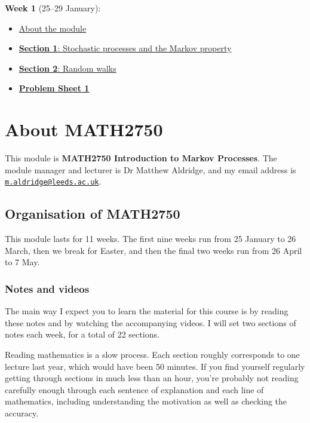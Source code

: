 \documentclass[
  a4paper,
]{article}
\providecommand{\tightlist}{%
  \setlength{\itemsep}{0pt}\setlength{\parskip}{0pt}}
\theoremstyle{definition}
\theoremstyle{definition}
\theoremstyle{definition}
\theoremstyle{remark}
\begin{document}
\textbf{Week 1} (25--29 January):

\begin{itemize}
\tightlist
\item
  \protect\hyperlink{S00-about}{About the module}
\item
  \protect\hyperlink{S01-stochastic-processes}{\textbf{Section 1}: Stochastic processes and the Markov property}
\item
  \protect\hyperlink{S02-random-walk}{\textbf{Section 2}: Random walks}
\item
  \protect\hyperlink{P01}{\textbf{Problem Sheet 1}}
\end{itemize}

\hypertarget{S00-about}{%
\section*{About MATH2750}\label{S00-about}}

This module is \textbf{MATH2750 Introduction to Markov Processes}. The module manager and lecturer is Dr Matthew Aldridge, and my email address is \href{mailto:m.aldridge@leeds.ac.uk}{\nolinkurl{m.aldridge@leeds.ac.uk}}.

\hypertarget{about-module}{%
\subsection*{Organisation of MATH2750}\label{about-module}}

This module lasts for 11 weeks. The first nine weeks run from 25 January to 26 March, then we break for Easter, and then the final two weeks run from 26 April to 7 May.

\hypertarget{notes}{%
\subsubsection*{Notes and videos}\label{notes}}

The main way I expect you to learn the material for this course is by reading these notes and by watching the accompanying videos. I will set two sections of notes each week, for a total of 22 sections.

Reading mathematics is a slow process. Each section roughly corresponds to one lecture last year, which would have been 50 minutes. If you find yourself regularly getting through sections in much less than an hour, you're probably not reading carefully enough through each sentence of explanation and each line of mathematics, including understanding the motivation as well as checking the accuracy.
\end{document}
